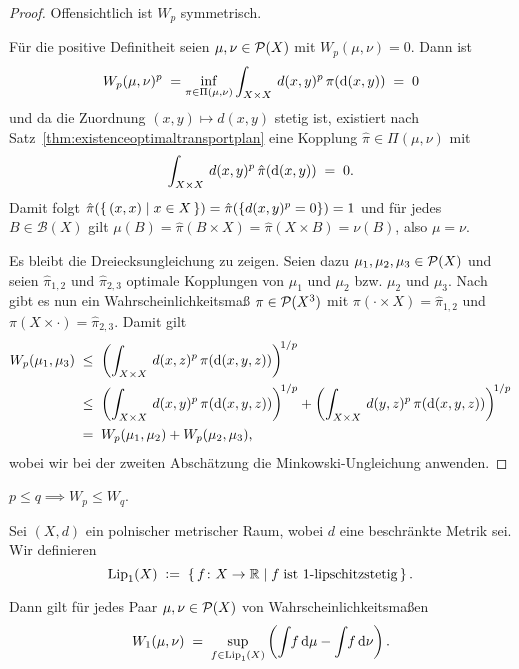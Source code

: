 \documentclass[../main/main.tex]{subfiles}
\begin{document}
	\begin{proof}
		Offensichtlich ist $W_p$ symmetrisch.
		
		Für die positive Definitheit seien $\mu, \nu \in \mathcal{P}(X)$ mit $W_p(\mu, \nu) = 0$. Dann ist
		\[ W_p(\mu, \nu)^p \; = \inf_{\pi \in \Pi(\mu, \nu)} \int_{X \times X} \, d(x, y)^p \, \pi(\mathrm{d}(x, y)) \; = \; 0 \]
		und da die Zuordnung $(x, y) \mapsto d(x, y)$ stetig ist, existiert nach Satz~\ref{thm:existenceoptimaltransportplan} eine Kopplung $\hat{\pi} \in \Pi(\mu, \nu)$ mit
		\[ \int_{X \times X} \, d(x, y)^p \, \hat{\pi}(\mathrm{d}(x, y)) \; = \; 0 \text{.} \]
		Damit folgt $\hat{\pi}(\left\{\, (x, x) \; \middle| \; x \in X \,\right\}) = \hat{\pi}(\left\{d(x, y)^p = 0\right\}) = 1$ und für jedes $B \in \mathcal{B}(X)$ gilt
		$\mu(B) = \hat{\pi}(B \times X) = \hat{\pi}(X \times B) = \nu(B)$, also $\mu = \nu$.
		
		Es bleibt die Dreiecksungleichung zu zeigen. Seien dazu $\mu_1, \mu_2, \mu_3 \in \mathcal{P}(X)$ und seien $\hat{\pi}_{1, 2}$ und $\hat{\pi}_{2, 3}$ optimale Kopplungen von
		$\mu_1$ und $\mu_2$ bzw. $\mu_2$ und $\mu_3$. Nach \cite[S. 23-24]{Villani.2009} gibt es nun ein Wahrscheinlichkeitsmaß $\pi \in \mathcal{P}(X^3)$ mit 
		$\pi(\cdot \times X) = \hat{\pi}_{1, 2}$ und $\pi(X \times \cdot) = \hat{\pi}_{2, 3}$. Damit gilt
		\begin{align*}
			W_p(\mu_1, \mu_3) \; &\leq \; \left(\int_{X \times X} \, d(x, z)^p \, \pi(\mathrm{d}(x, y, z))\right)^{\! 1/p} \\
			                     &\leq \; \left(\int_{X \times X} \, d(x, y)^p \, \pi(\mathrm{d}(x, y, z))\right)^{\! 1/p} + \left(\int_{X \times X} \, d(y, z)^p \, \pi(\mathrm{d}(x, y, z))\right)^{\! 1/p} \\
			                     &=    \; W_p(\mu_1, \mu_2) + W_p(\mu_2, \mu_3) \text{,}
		\end{align*}
		wobei wir bei der zweiten Abschätzung die Minkowski-Ungleichung anwenden.
	\end{proof}

	\begin{Bemerkung}
		$p \leq q \implies W_p \leq W_q$.
	\end{Bemerkung}

	\begin{Satz}
		\label{thm:kantorovichrubinstein}
		Sei $(X, d)$ ein polnischer metrischer Raum, wobei $d$ eine beschränkte Metrik sei. Wir definieren
		\[ \mathrm{Lip}_1(X) \; \vcentcolon = \; \left\{\, f \colon X \to \mathbb{R} \; \middle| \; f \; \text{ist }1\text{-lipschitzstetig}  \,\right\} \text{.} \]
		
		Dann gilt für jedes Paar $\mu, \nu \in \mathcal{P}(X)$ von Wahrscheinlichkeitsmaßen
		\[ W_1(\mu, \nu) \; = \; \sup_{f \in \mathrm{Lip}_1(X)} \left( \int_{} \, f \, \mathrm{d}\mu - \int_{} \, f \, \mathrm{d}\nu \right) \text{.} \]
	\end{Satz}
\end{document}
